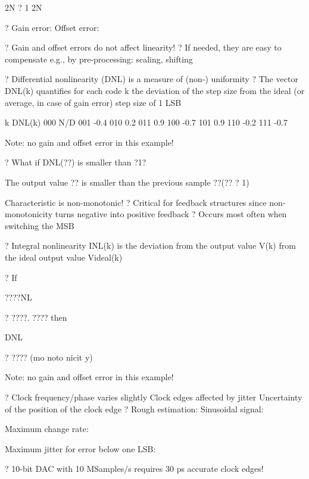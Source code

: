 \documentclass[2pt,landscape]{article}
\begin{document}
\begin{multicols*}{5}
2N ? 1
2N



?	Gain error:	Offset error:


?	Gain and offset errors do not affect linearity!
?	If needed, they are easy to compensate
\textbullet 	e.g., by pre-processing: scaling, shifting



?	Differential nonlinearity (DNL) is a measure of (non-) uniformity
?	The vector DNL(k) quantifies for each code k the deviation of the step 
size from the ideal (or average, in case of gain error) step size of 1 LSB



k
DNL(k)
000
N/D
001
-0.4
010
0.2
011
0.9
100
-0.7
101
0.9
110
-0.2
111
-0.7

Note: no gain and offset 
error in this example!



?	What if DNL(??) is smaller than ?1?

\textbullet 	The output value ??	is smaller than the previous sample ??(?? ? 1)

\textbullet 	Characteristic is non-monotonic!
?	Critical for feedback structures since non-monotonicity turns negative 
into positive feedback
?	Occurs most often when switching the MSB



?	Integral nonlinearity INL(k) is the deviation from the output value V(k) 
from the ideal output value Videal(k)


?	If


????NL


? 
????. 
???? 
then


DNL


? 
???? 
(mo
noto
nicit
y)







Note: no gain and offset 
error in this example!



?	Clock frequency/phase varies slightly
\textbullet 	Clock edges affected by jitter
\textbullet 	Uncertainty of the position of the clock edge
?	Rough estimation:
\textbullet 	Sinusoidal signal:

\textbullet 	Maximum change rate:

\textbullet 	Maximum jitter for error below one LSB:

?	10-bit DAC with 10 MSamples/s requires 30 ps accurate clock edges!




\end{multicols*}
\end{document}
